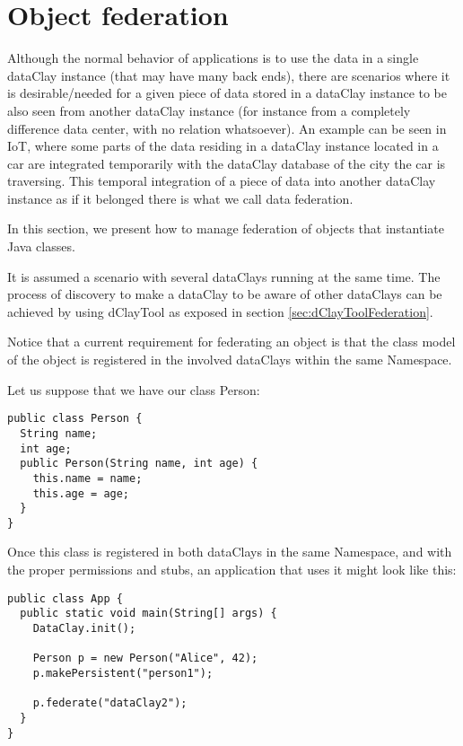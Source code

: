 \section{Object federation}
\label{sec:jFederation}


Although the normal behavior of applications is to use the data in a single dataClay instance (that may have many back ends), there are scenarios where it is desirable/needed for a given piece of data stored in a dataClay instance to be also seen from another dataClay instance (for instance from a completely difference data center, with no relation whatsoever). An example can be seen in IoT, where some parts of the data residing in a dataClay instance located in a car are integrated temporarily with the dataClay database of the city the car is traversing. This temporal integration of a piece of data into another dataClay instance as if it belonged there is what we call data federation.

In this section, we present how to manage federation of objects that instantiate Java classes. 

It is assumed a scenario with several dataClays running at the same time. The process 
of discovery to make a dataClay to be aware of other dataClays can be achieved by using dClayTool as 
exposed in section \ref{sec:dClayToolFederation}.

Notice that a current requirement for federating an object is that the class model of the object is registered in the involved 
dataClays within the same Namespace.

Let us suppose that we have our class Person:

\begin{tBox}
\begin{lstlisting}
public class Person {
  String name;
  int age;
  public Person(String name, int age) {
    this.name = name;
    this.age = age;
  }
}
\end{lstlisting}
\end{tBox}

Once this class is registered in both dataClays in the same Namespace, and with the proper permissions and stubs, 
an application that uses it might look like this:

\begin{tBox}
\begin{lstlisting}
public class App {
  public static void main(String[] args) {
    DataClay.init();
    
    Person p = new Person("Alice", 42);
    p.makePersistent("person1");
    
    p.federate("dataClay2");
  }
}
\end{lstlisting}
\end{tBox}

